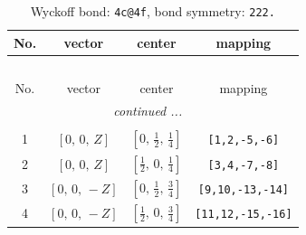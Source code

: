 \documentclass[fleqn,8pt]{jsarticle}
\begin{document}
\renewcommand{\arraystretch}{1.2}
\begin{longtable}{cccc}
\caption{Wyckoff bond: {\tt 4c@4f}, bond symmetry: {\tt 222.}}
 \\
 \hline \hline
No. & vector & center & mapping \\ \hline \endfirsthead

\multicolumn{3}{l}{\tablename\ \thetable{}} \\
 \hline \hline
No. & vector & center & mapping \\ \hline \endhead

 \hline \hline
\multicolumn{3}{r}{\footnotesize\it continued ...} \\ \endfoot

 \hline \hline
\multicolumn{3}{r}{} \\ \endlastfoot

1 & $\left[ 0,\, 0,\, Z \right]$ & $\left[ 0,\, \frac{1}{2},\, \frac{1}{4} \right]$ & {\tt [1,2,-5,-6]} \\ \hline
2 & $\left[ 0,\, 0,\, Z \right]$ & $\left[ \frac{1}{2},\, 0,\, \frac{1}{4} \right]$ & {\tt [3,4,-7,-8]} \\ \hline
3 & $\left[ 0,\, 0,\, - Z \right]$ & $\left[ 0,\, \frac{1}{2},\, \frac{3}{4} \right]$ & {\tt [9,10,-13,-14]} \\ \hline
4 & $\left[ 0,\, 0,\, - Z \right]$ & $\left[ \frac{1}{2},\, 0,\, \frac{3}{4} \right]$ & {\tt [11,12,-15,-16]} \\
\end{longtable}
\renewcommand{\arraystretch}{1.2}
\end{document}
